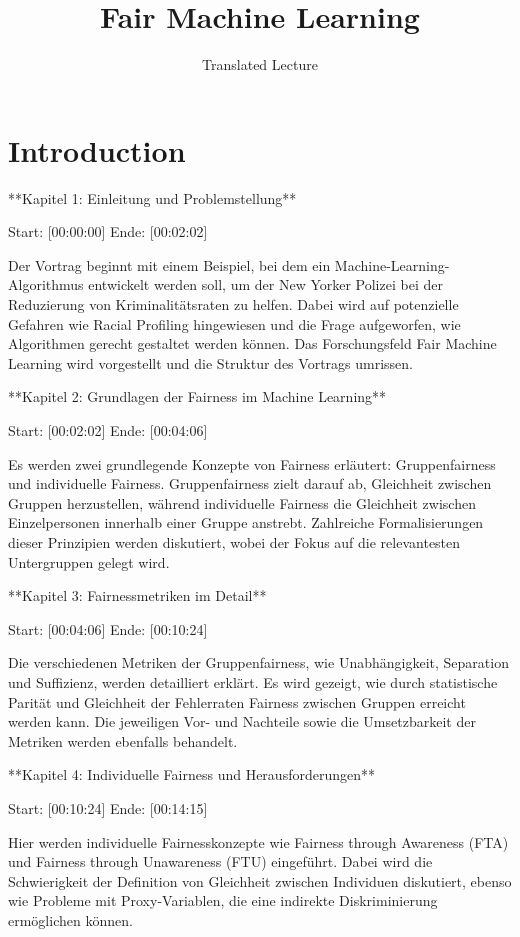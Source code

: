 \documentclass[12pt]{article}
\title{Fair Machine Learning}
\author{Translated Lecture}
\date{}
\begin{document}
\maketitle

\section*{Introduction}
**Kapitel 1: Einleitung und Problemstellung**

Start: [00:00:00]  
Ende: [00:02:02]  

Der Vortrag beginnt mit einem Beispiel, bei dem ein Machine-Learning-Algorithmus entwickelt werden soll, um der New Yorker Polizei bei der Reduzierung von Kriminalitätsraten zu helfen. Dabei wird auf potenzielle Gefahren wie Racial Profiling hingewiesen und die Frage aufgeworfen, wie Algorithmen gerecht gestaltet werden können. Das Forschungsfeld Fair Machine Learning wird vorgestellt und die Struktur des Vortrags umrissen.

**Kapitel 2: Grundlagen der Fairness im Machine Learning**

Start: [00:02:02]  
Ende: [00:04:06]  

Es werden zwei grundlegende Konzepte von Fairness erläutert: Gruppenfairness und individuelle Fairness. Gruppenfairness zielt darauf ab, Gleichheit zwischen Gruppen herzustellen, während individuelle Fairness die Gleichheit zwischen Einzelpersonen innerhalb einer Gruppe anstrebt. Zahlreiche Formalisierungen dieser Prinzipien werden diskutiert, wobei der Fokus auf die relevantesten Untergruppen gelegt wird.

**Kapitel 3: Fairnessmetriken im Detail**

Start: [00:04:06]  
Ende: [00:10:24]  

Die verschiedenen Metriken der Gruppenfairness, wie Unabhängigkeit, Separation und Suffizienz, werden detailliert erklärt. Es wird gezeigt, wie durch statistische Parität und Gleichheit der Fehlerraten Fairness zwischen Gruppen erreicht werden kann. Die jeweiligen Vor- und Nachteile sowie die Umsetzbarkeit der Metriken werden ebenfalls behandelt.

**Kapitel 4: Individuelle Fairness und Herausforderungen**

Start: [00:10:24]  
Ende: [00:14:15]  

Hier werden individuelle Fairnesskonzepte wie Fairness through Awareness (FTA) und Fairness through Unawareness (FTU) eingeführt. Dabei wird die Schwierigkeit der Definition von Gleichheit zwischen Individuen diskutiert, ebenso wie Probleme mit Proxy-Variablen, die eine indirekte Diskriminierung ermöglichen können.
\end{document}
